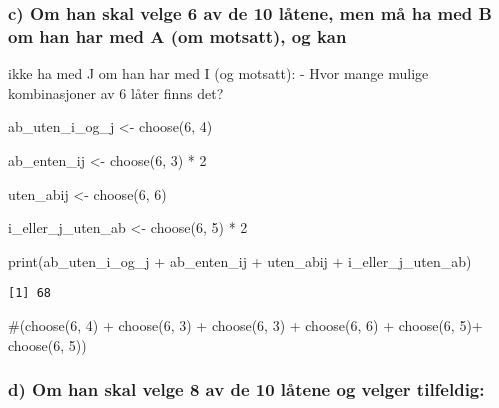 \documentclass[
  12pt,
  a4paper,
  DIV=11,
  numbers=noendperiod]{scrartcl}
\newenvironment{Shaded}{\begin{snugshade}}{\end{snugshade}}
\newcommand{\CommentTok}[1]{\textcolor[rgb]{0.37,0.37,0.37}{#1}}
\newcommand{\DecValTok}[1]{\textcolor[rgb]{0.68,0.00,0.00}{#1}}
\newcommand{\FunctionTok}[1]{\textcolor[rgb]{0.28,0.35,0.67}{#1}}
\newcommand{\NormalTok}[1]{\textcolor[rgb]{0.00,0.23,0.31}{#1}}
\newcommand{\OtherTok}[1]{\textcolor[rgb]{0.00,0.23,0.31}{#1}}
\newcommand{\SpecialCharTok}[1]{\textcolor[rgb]{0.37,0.37,0.37}{#1}}
\begin{document}
\subsubsection{c) Om han skal velge 6 av de 10 låtene, men må ha med B
om han har med A (om motsatt), og
kan}\label{c-om-han-skal-velge-6-av-de-10-luxe5tene-men-muxe5-ha-med-b-om-han-har-med-a-om-motsatt-og-kan}

ikke ha med J om han har med I (og motsatt): - Hvor mange mulige
kombinasjoner av 6 låter finns det?

\begin{Shaded}
\begin{Highlighting}[]
\NormalTok{ab\_uten\_i\_og\_j }\OtherTok{\textless{}{-}} \FunctionTok{choose}\NormalTok{(}\DecValTok{6}\NormalTok{, }\DecValTok{4}\NormalTok{)}


\NormalTok{ab\_enten\_ij }\OtherTok{\textless{}{-}} \FunctionTok{choose}\NormalTok{(}\DecValTok{6}\NormalTok{, }\DecValTok{3}\NormalTok{) }\SpecialCharTok{*} \DecValTok{2} 

\NormalTok{uten\_abij }\OtherTok{\textless{}{-}} \FunctionTok{choose}\NormalTok{(}\DecValTok{6}\NormalTok{, }\DecValTok{6}\NormalTok{)}


\NormalTok{i\_eller\_j\_uten\_ab }\OtherTok{\textless{}{-}} \FunctionTok{choose}\NormalTok{(}\DecValTok{6}\NormalTok{, }\DecValTok{5}\NormalTok{) }\SpecialCharTok{*} \DecValTok{2}



\FunctionTok{print}\NormalTok{(ab\_uten\_i\_og\_j }\SpecialCharTok{+}\NormalTok{ ab\_enten\_ij }\SpecialCharTok{+}\NormalTok{ uten\_abij }\SpecialCharTok{+}\NormalTok{ i\_eller\_j\_uten\_ab)}
\end{Highlighting}
\end{Shaded}

\begin{verbatim}
[1] 68
\end{verbatim}

\begin{Shaded}
\begin{Highlighting}[]
\CommentTok{\#(choose(6, 4) + choose(6, 3) + choose(6, 3) + choose(6, 6) + choose(6, 5)+ choose(6, 5))}
\end{Highlighting}
\end{Shaded}

\subsubsection{d) Om han skal velge 8 av de 10 låtene og velger
tilfeldig:}\label{d-om-han-skal-velge-8-av-de-10-luxe5tene-og-velger-tilfeldig}
\end{document}
